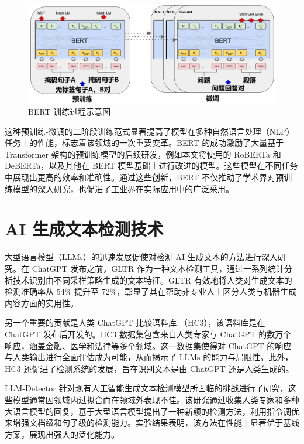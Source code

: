 \begin{figure}[htb]
	\centering
	\includegraphics[width=0.9\linewidth]{figures/BERT_Overall.jpg}
	\caption{BERT 训练过程示意图 \cite{devlin_bert_2019}}
	\label{fig:BERT-OverAll}
\end{figure}

这种预训练-微调的二阶段训练范式显著提高了模型在多种自然语言处理（NLP）任务上的性能，标志着该领域的一次重要变革。BERT 的成功激励了大量基于 Transformer 架构的预训练模型的后续研发，例如本文将使用的 RoBERTa 和 DeBERTa，以及其他在 BERT 模型基础上进行改进的模型。这些模型在不同任务中展现出更高的效率和准确性。通过这些创新，BERT 不仅推动了学术界对预训练模型的深入研究，也促进了工业界在实际应用中的广泛采用。

\section{AI 生成文本检测技术}
\label{sec:llmdetect}

大型语言模型（LLMs）的迅速发展促使对检测 AI 生成文本的方法进行深入研究。在 ChatGPT 发布之前，GLTR \cite{gehrmann_gltr_2019} 作为一种文本检测工具，通过一系列统计分析技术识别由不同采样策略生成的文本特征。GLTR 有效地将人类对生成文本的检测准确率从 54\% 提升至 72\%，彰显了其在帮助非专业人士区分人类与机器生成内容方面的实用性。

另一个重要的贡献是人类 ChatGPT 比较语料库 \cite{guo_how_2023}（HC3），该语料库是在 ChatGPT 发布后开发的。HC3 数据集包含来自人类专家与 ChatGPT 的数万个响应，涵盖金融、医学和法律等多个领域。这一数据集使得对 ChatGPT 的响应与人类输出进行全面评估成为可能，从而揭示了 LLMs 的能力与局限性。此外，HC3 还促进了检测系统的发展，旨在识别文本是由 ChatGPT 还是人类生成的。

LLM-Detector \cite{wang_llm-detector_2024} 针对现有人工智能生成文本检测模型所面临的挑战进行了研究，这些模型通常因领域内过拟合而在领域外表现不佳。该研究通过收集人类专家和多种大语言模型的回复，基于大型语言模型提出了一种新颖的检测方法，利用指令调优来增强文档级和句子级的检测能力。实验结果表明，该方法在性能上显著优于基线方案，展现出强大的泛化能力。

